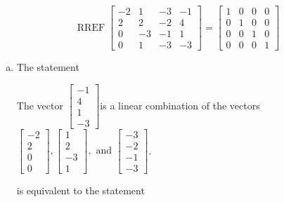 \begin{exerciseAnswer} 
\[\operatorname{RREF}  \left[\begin{array}{ccc|c}
-2 & 1 & -3 & -1 \\
2 & 2 & -2 & 4 \\
0 & -3 & -1 & 1 \\
0 & 1 & -3 & -3
\end{array}\right] = \left[\begin{array}{ccc|c}
1 & 0 & 0 & 0 \\
0 & 1 & 0 & 0 \\
0 & 0 & 1 & 0 \\
0 & 0 & 0 & 1
\end{array}\right] \]
\begin{enumerate}[(a)]
\item  The statement 
\begin{center}\begin{minipage}{0.8\textwidth}
 The vector \( \left[\begin{array}{c}
-1 \\
4 \\
1 \\
-3
\end{array}\right] \)is a linear combination of the vectors \( \left[\begin{array}{c}
-2 \\
2 \\
0 \\
0
\end{array}\right] , \left[\begin{array}{c}
1 \\
2 \\
-3 \\
1
\end{array}\right] , \text{ and } \left[\begin{array}{c}
-3 \\
-2 \\
-1 \\
-3
\end{array}\right] \). 
\end{minipage}\end{center}
     is equivalent to the statement 
\begin{center}\begin{minipage}{0.8\textwidth}
 The vector equation \( x_{1} \left[\begin{array}{c}
-2 \\
2 \\
0 \\
0
\end{array}\right] + x_{2} \left[\begin{array}{c}

\end{array}
\end{minipage}
\end{center}
\end{enumerate}
\end{exerciseAnswer}
